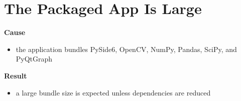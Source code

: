 \documentclass[
  9pt,
  letterpaper,
  oneside,
  open=any,
  DIV=15,
  parskip=half-,
  headings=big,
  numbers=noenddot
]{scrbook}
\newcommand{\manuallead}[1]{%
  \vspace{0.15em}%
  {\sffamily\bfseries\color{ManualBlue}#1}\par\nobreak\vspace{0.05em}%
}
\begin{document}
\section{The Packaged App Is Large}

\manuallead{Cause}

\begin{itemize}[leftmargin=*,itemsep=0.35em,topsep=0.4em]
\item the application bundles PySide6, OpenCV, NumPy, Pandas, SciPy, and PyQtGraph
\end{itemize}

\manuallead{Result}

\begin{itemize}[leftmargin=*,itemsep=0.35em,topsep=0.4em]
\item a large bundle size is expected unless dependencies are reduced
\end{itemize}
\end{document}
